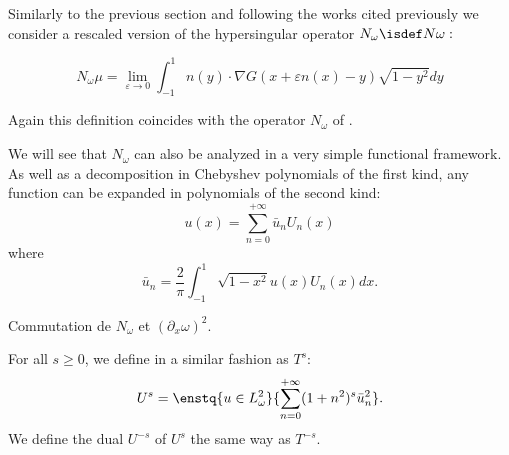 \documentclass[]{article}
\begin{document}
Similarly to the previous section and following the works cited previously we consider a rescaled version of the hypersingular operator $N_\omega \isdef N \omega:$

\[N_\omega \mu = \lim_{\varepsilon\to 0}\int_{-1}^{1} n(y)\cdot\nabla G(x + \varepsilon n(x) - y) \sqrt{1-y^2} dy\]

Again this definition coincides with the operator $N_\omega$ of \cite{bruno2012second}.

We will see that $N_\omega$ can also be analyzed in a very simple functional framework. As well as a decomposition in Chebyshev polynomials of the first kind, any function can be expanded in polynomials of the second kind: 
\[u(x) = \sum_{n=0}^{+\infty} \bar{u}_n U_n(x)\]
where 
\[\bar{u}_n = \dfrac{2}{\pi}\int_{-1}^{1}\sqrt{1 - x^2}u(x)U_n(x)dx.\]

\begin{Prop}
	Commutation de $N_\omega$ et $(\partial_x \omega)^2$. 
\end{Prop}

\begin{Def}
	For all $s \geq 0$, we define in a similar fashion as $T^s$:
	\[U^s = \enstq{u \in L^2_\omega}{ \sum_{n=0}^{+\infty} (1 + n^2)^s\bar{u}_n^2}.\]
	We define the dual $U^{-s}$ of $U^s$ the same way as $T^{-s}$. 
\end{Def}
\end{document}
